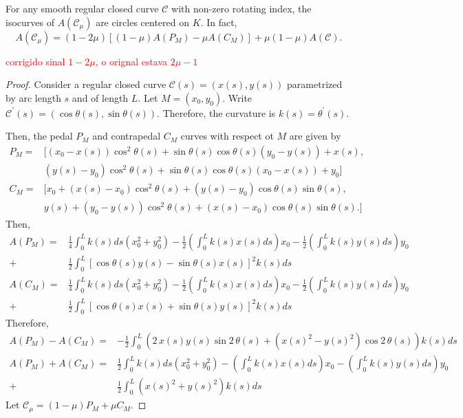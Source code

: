 \begin{proposition}
\label{prop:amu-concave}
For any smooth regular closed curve $\mathcal{C}$ with non-zero rotating index, the isocurves of $A(\mathcal{C}_\mu)$ are circles centered on $K$.
In fact, \[A(\mathcal{C}_\mu) =(1-2\mu)[(1-\mu) A(P_M)-\mu A(C_M)]+\mu(1-\mu)A(\mathcal{C}).\]
\end{proposition}
\textcolor{red}{corrigido sinal $1-2\mu$,  o orignal estava $2 \mu-1$}
\begin{proof}
Consider a regular closed curve $\mathcal{C}(s)=(x(s),y(s))$ parametrized by arc length $s$ and of length $L$. Let   $M=(x_0,y_0)$. Write $\mathcal{C}^\prime(s)=(\cos\theta(s),\sin\theta(s)).$ Therefore, the curvature is  $k(s)=\theta^\prime(s)$.

Then, the pedal $P_M$ and contrapedal $C_M$ curves with respect ot $M$ are given by
{\small
\begin{align*}
    P_M=& [ (x_0-x(s))\cos^2\theta(s) +\sin\theta(s)\cos \theta(s) (y_0-y(s) )+x(s),\\
    &(y(s)-y_0 )\cos^2\theta(s) +\sin\theta(s)\cos\theta(s) (x_0-x(s))+y_0 ]\\
    C_M=& [x_0+(x(s)-x_0)\cos^2\theta(s)+(y(s)-y_0)\cos\theta(s)\sin\theta(s) ,
    \\&y(s)+(y_0-y(s))\cos^2\theta(s)+(x(s)-x_0)\cos\theta(s)\sin\theta(s). ]
\end{align*}
}
Then,
{\tiny
\begin{align*}
A(P_M)=& \frac{1}{4}\int_0^L k(s)ds\left(x_0^2+ y_0^2\right)- \frac{1}{2}\left(\int_0^L k(s)x(s) ds \right) x_0 -\frac{1}{2}\left(\int_0^L k(s)y(s) ds \right)y_0 \\
+&\frac{1}{2}\int_0^L[\cos\theta(s) y(s)-\sin\theta(s)x(s)]^2 k(s)ds
\\
A(C_M)=& \frac{1}{4}\int_0^L k(s)ds\left(x_0^2+ y_0^2\right)- \frac{1}{2}\left(\int_0^L k(s)x(s) ds \right) x_0 -\frac{1}{2}\left(\int_0^L k(s)y(s) ds \right)y_0 \\
+&\frac{1}{2}\int_0^L[\cos\theta(s) x(s)+\sin\theta(s)y(s)]^2 k(s)ds
\end{align*}
  Therefore, \begin{align*}
      A(P_M)-A(C_M)= &   -\frac{1}{2} \int_0^L    \left( 2\,x \left( s \right) y \left( s \right) \sin   2\,
\theta \left( s \right)    + (    x \left( s \right)  ^{2}  -  y \left( s
  \right) ^{2}) \cos   2\,\theta \left( s
 \right)   \right)   
 k(s)ds  \\
  A(P_M)+A(C_M)= &   \frac{1}{2}\int_0^L k(s)ds\left(x_0^2+ y_0^2\right)-\left(\int_0^L k(s)x(s) ds \right) x_0 - \left(\int_0^L k(s)y(s) ds \right)y_0\\
  +&\frac{1}{2}\int_0^L (x(s)^2+y(s)^2)k(s)ds
  \end{align*}
 }
Let $\mathcal{C}_\mu=(1-\mu) P_M+{\mu}C_M$.


\end{proof}

